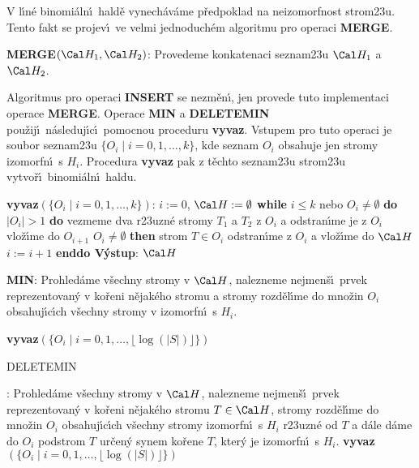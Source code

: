 \flushpar V l\'\i n\'e binomi\'aln\'\i\ hald\v e vynech\'av\'ame p\v redpoklad 
na neizo\-morf\-nost strom\accent23u. Tento fakt se 
projev\'\i\ ve velmi jednoduch\'em algoritmu pro operaci 
{\bf MERGE}.
\medskip

{\bf MERGE$(\Cal H_1,\Cal H_2)$}:\newline 
Provedeme konkatenaci seznam\accent23u $\Cal H_1$ a $\Cal H_2$.
\bigskip

\flushpar Algoritmus pro operaci {\bf INSERT} se nezm\v en\'\i , jen 
provede tuto implementaci operace {\bf MERGE}.  Operace 
{\bf MIN} a {\bf DELETE\-MIN} pou\v zij\'\i\ n\'asleduj\'\i c\'\i\ pomocnou 
proceduru {\bf vyvaz}.  Vstupem pro tuto operaci je soubor 
seznam\accent23u $\{O_i\mid i=0,1,\dots,k\}$, kde seznam $O_i$ 
obsahuje jen stromy izomorfn\'\i\ s $H_i$.  
Procedura {\bf vyvaz} pak z t\v echto seznam\accent23u strom\accent23u 
vytvo\v r\'\i\ binomi\'aln\'\i\ hal\-du.  
\bigskip

{\bf vyvaz$(\{O_i\mid i=0,1,\dots,k\})$}:\newline 
$i:=0$, $\Cal H:=\emptyset$\newline 
{\bf while} $i\le k$ nebo $O_i\ne\emptyset$ {\bf do}\newline 
\phantom{---}{\bf while} $|O_i|>1$ {\bf do\newline}
\phantom{------}vezmeme dva r\accent23uzn\'e stromy $T_1$ a $T_2$ z $O_i$ a 
odstran\'\i me je z $O_i$\newline 
\phantom{------}{\bf spoj$(T_1,T_2)$} vlo\v z\'\i me do $O_{i+1}$\newline 
\phantom{---}{\bf enddo}\newline 
\phantom{---}{\bf if} $O_i\ne\emptyset$ {\bf then}\newline 
\phantom{------}strom $T\in O_i$ odstran\'\i me z $O_i$ a vlo\v z\'\i me do $\Cal H$\newline 
\phantom{---}{\bf endif}\newline 
\phantom{---}$i:=i+1$\newline 
{\bf enddo\newline 
V\'ystup}: $\Cal H$
\bigskip

{\bf MIN}:\newline 
Prohled\'ame v\v sechny stromy v $\Cal H$, nalezneme nejmen\v s\'\i\ prvek 
repre\-zentovan\'y v ko\v reni n\v ejak\'eho stromu a stromy 
rozd\v el\'\i me do mno\v zin $O_i$ obsahuj\'\i c\'\i ch v\v sechny stromy v 
izomorfn\'\i\ s $H_i$.\newline 
{\bf vyvaz$(\{O_i\mid i=0,1,\dots,\lfloor\log(|S|)\rfloor \})$
\bigskip

DELETEMIN}:\newline 
Prohled\'ame v\v sechny stromy v $\Cal H$, nalezneme nejmen\v s\'\i\ prvek 
repre\-zentovan\'y v ko\v reni n\v ejak\'eho stromu $T\in \Cal H$, stromy 
rozd\v e\-l\'\i me do mno\v zin $O_i$ obsahuj\'\i c\'\i ch v\v sechny stromy  
izomorfn\'\i\ s $H_i$ r\accent23uzn\'e od $T$ a d\'ale d\'ame do 
$O_i$ podstrom $T$ ur\v cen\'y synem ko\v rene $T$, kter\'y je  
izomorfn\'\i\ s $H_i$.\newline 
{\bf vyvaz$(\{O_i\mid i=0,1,\dots,\lfloor\log(|S|)\rfloor \})$}
\bigskip

